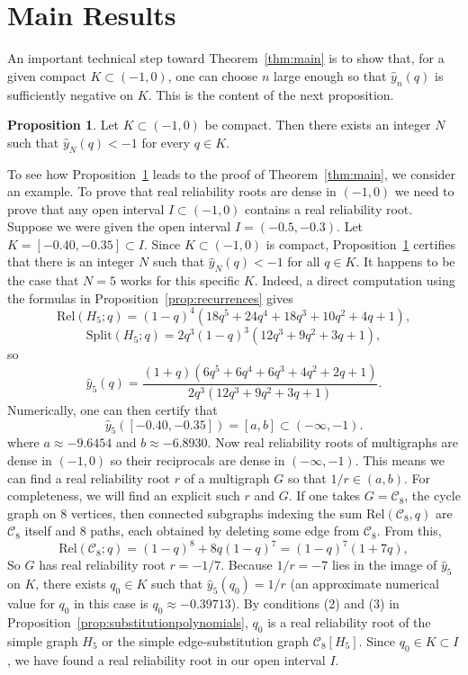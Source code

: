 \documentclass[12pt]{amsart}
\theoremstyle{definition}
\newtheorem{proposition}[theorem]{Proposition}
\renewcommand{\S}{\text{Split}}
\newcommand{\R}{\text{Rel}}
\begin{document}
\section{Main Results}\label{sec:main}

An important technical step toward Theorem~\ref{thm:main} is to show that, for a given compact $K \subset (-1,0)$, one can choose $n$ large enough so that $\hat{y}_n(q)$ is sufficiently negative on $K$. This is the content of the next proposition.

\begin{proposition}\label{prop:yn}
Let $K \subset (-1,0)$ be compact. Then there exists an integer $N$ such that $\hat{y}_N(q)<-1$ for every $q \in K$.
\end{proposition}

To see how Proposition~\ref{prop:yn} leads to the proof of Theorem~\ref{thm:main}, we consider an example. To prove that real reliability roots are dense in $(-1,0)$ we need to prove that any open interval $I \subset (-1,0)$ contains a real reliability root. Suppose we were given the open interval $I=(-0.5,-0.3)$. Let $K=[-0.40,-0.35] \subset I$. Since $K \subset (-1,0)$ is compact, Proposition~\ref{prop:yn} certifies that there is an integer $N$ such that $\hat{y}_N(q)<-1$ for all $q \in K$. It happens to be the case that $N=5$ works for this specific $K$. Indeed, a direct computation using the formulas in Proposition~\ref{prop:recurrences} gives
\[
\R(H_5;q)=(1-q)^4(18q^5+24q^4+18q^3+10q^2+4q+1),
\]
\[
\S(H_5;q)=2q^3(1-q)^3(12q^3+9q^2+3q+1),
\]
so
\[
\hat{y}_5(q)=
\frac{(1+q)(6q^5+6q^4+6q^3+4q^2+2q+1)}
{2q^3(12q^3+9q^2+3q+1)}.
\]
Numerically, one can then certify that 
\[
\hat{y}_5([-0.40,-0.35])=[a,b]\subset(-\infty,-1).
\]
where $a \approx -9.6454$ and $b \approx -6.8930$. Now real reliability roots of multigraphs are dense in $(-1,0)$ so their reciprocals are dense in $(-\infty,-1)$. This means we can find a real reliability root $r$ of a multigraph $G$ so that $1/r \in (a,b)$. For completeness, we will find an explicit such $r$ and $G$. If one takes $G=\mathcal{C}_8$, the cycle graph on $8$ vertices, then connected subgraphs indexing the sum $\R(\mathcal{C}_8,q)$ are $\mathcal{C}_8$ itself and $8$ paths, each obtained by deleting some edge from $\mathcal{C}_8$. From this, 
\[
\R(\mathcal{C}_8;q)=(1-q)^8+8q(1-q)^{7}=(1-q)^{7}(1+7q),
\]
So $G$ has real reliability root $r=-1/7$. Because $1/r=-7$ lies in the image of $\hat{y}_5$ on $K$, there exists $q_0 \in K$ such that $\hat{y}_5(q_0)=1/r$ (an approximate numerical value for $q_0$ in this case is $q_0\approx -0.39713$). By conditions (2) and (3) in Proposition~\ref{prop:substitutionpolynomials}, $q_0$ is a real reliability root of the simple graph $H_5$ or the simple edge-substitution graph $\mathcal{C}_8[H_5]$. Since $q_0 \in K \subset I$, we have found a real reliability root in our open interval $I$.
\end{document}
